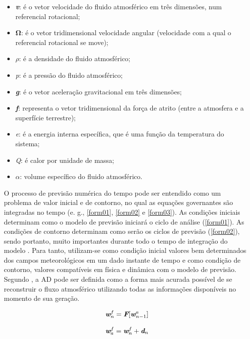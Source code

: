 \begin{itemize}
\item \textbf{\textit{v}}: é o vetor velocidade do fluido atmosférico em três dimensões, num referencial rotacional;
\item $\mathbf{\Omega}$: é o vetor tridimensional velocidade angular (velocidade com a qual o referencial rotacional se move);
\item $\rho$: é a densidade do fluido atmosférico;
\item \textit{p}: é a pressão do fluido atmosférico;
\item \textbf{\textit{g}}: é o vetor aceleração gravitacional em três dimensões;
\item \textbf{\textit{f}}: representa o vetor tridimensional da força de atrito (entre a atmosfera e a superfície terrestre);
\item \textit{e}: é a energia interna específica, que é uma função da temperatura do sistema;
\item \textit{Q}: é calor por unidade de massa;
\item $\alpha$: volume específico do fluido atmosférico. 
\end{itemize}

O processo de previsão numérica do tempo pode ser entendido como um problema de valor inicial e de contorno, no qual as equações governantes são integradas no tempo (e. g., \autoref{form01}, \autoref{form02} e \autoref{form03}). As condições iniciais determinam como o modelo de previsão iniciará o ciclo de análise (\autoref{form01}). As condições de contorno determinam como serão os ciclos de previsão (\autoref{form02}), sendo portanto, muito importantes durante todo o tempo de integração do modelo \cite{nowosad2001}. Para tanto, utilizam-se como condição inicial valores bem determinados dos campos meteorológicos em um dado instante de tempo e como condição de contorno, valores compatíveis em física e dinâmica com o modelo de previsão. Segundo \cite{talagrand1997}, a AD pode ser definida como a forma mais acurada possível de se reconstruir o fluxo atmosférico utilizando todas as informações disponíveis no momento de sua geração. 

\begin{equation}
\textit{\textbf{w}}^{f}_{n}=\textit{\textbf{F}}[\textit{\textbf{w}}^{a}_{n-1}]
 \label{form04}
\end{equation}

\begin{equation}
\textit{\textbf{w}}^{f}_{a}=\textit{\textbf{w}}^{f}_{n}+\textit{\textbf{d}}_{n}
 \label{form05}
\end{equation}

